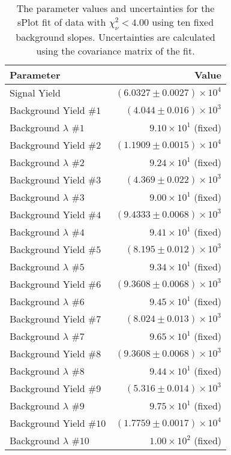 
\begin{table}[ht]
    \begin{center}
        \begin{tabular}{lr}\toprule
            Parameter & Value \\\midrule
            Signal Yield & $(6.0327 \pm 0.0027) \times 10^{4}$ \\
            Background Yield $\#1$ & $(4.044 \pm 0.016) \times 10^{3}$ \\
            Background $\lambda$ $\#1$ & $9.10 \times 10^{1}$ (fixed) \\
            Background Yield $\#2$ & $(1.1909 \pm 0.0015) \times 10^{4}$ \\
            Background $\lambda$ $\#2$ & $9.24 \times 10^{1}$ (fixed) \\
            Background Yield $\#3$ & $(4.369 \pm 0.022) \times 10^{3}$ \\
            Background $\lambda$ $\#3$ & $9.00 \times 10^{1}$ (fixed) \\
            Background Yield $\#4$ & $(9.4333 \pm 0.0068) \times 10^{3}$ \\
            Background $\lambda$ $\#4$ & $9.41 \times 10^{1}$ (fixed) \\
            Background Yield $\#5$ & $(8.195 \pm 0.012) \times 10^{3}$ \\
            Background $\lambda$ $\#5$ & $9.34 \times 10^{1}$ (fixed) \\
            Background Yield $\#6$ & $(9.3608 \pm 0.0068) \times 10^{3}$ \\
            Background $\lambda$ $\#6$ & $9.45 \times 10^{1}$ (fixed) \\
            Background Yield $\#7$ & $(8.024 \pm 0.013) \times 10^{3}$ \\
            Background $\lambda$ $\#7$ & $9.65 \times 10^{1}$ (fixed) \\
            Background Yield $\#8$ & $(9.3608 \pm 0.0068) \times 10^{3}$ \\
            Background $\lambda$ $\#8$ & $9.44 \times 10^{1}$ (fixed) \\
            Background Yield $\#9$ & $(5.316 \pm 0.014) \times 10^{3}$ \\
            Background $\lambda$ $\#9$ & $9.75 \times 10^{1}$ (fixed) \\
            Background Yield $\#10$ & $(1.7759 \pm 0.0017) \times 10^{4}$ \\
            Background $\lambda$ $\#10$ & $1.00 \times 10^{2}$ (fixed) \\\bottomrule
        \end{tabular}
        \caption{The parameter values and uncertainties for the sPlot fit of data with $\chi^2_\nu < 4.00$ using ten fixed background slopes. Uncertainties are calculated using the covariance matrix of the fit.}\label{tab:splot-fit-results-chisqdof-4.00-fixed-10}
    \end{center}
\end{table}
